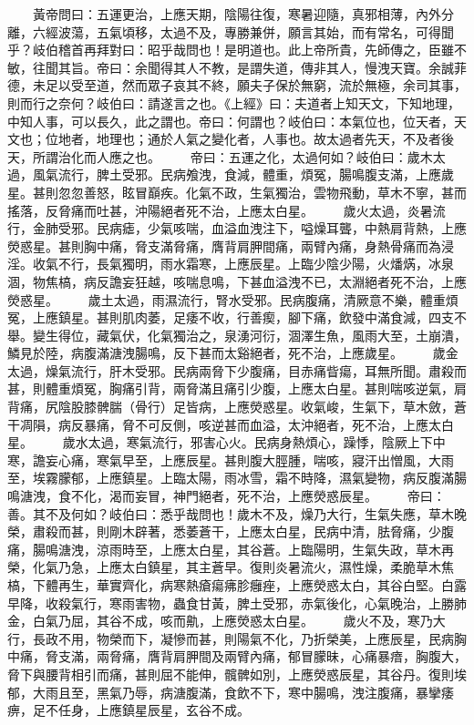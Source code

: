 　　黃帝問曰：五運更治，上應天期，陰陽往復，寒暑迎隨，真邪相薄，內外分離，六經波蕩，五氣頃移，太過不及，專勝兼併，願言其始，而有常名，可得聞乎？岐伯稽首再拜對曰：昭乎哉問也！是明道也。此上帝所貴，先師傳之，臣雖不敏，往聞其旨。帝曰：余聞得其人不教，是謂失道，傳非其人，慢洩天寶。余誠菲德，未足以受至道，然而眾子哀其不終，願夫子保於無窮，流於無極，余司其事，則而行之奈何？岐伯曰：請遂言之也。《上經》曰：夫道者上知天文，下知地理，中知人事，可以長久，此之謂也。帝曰：何謂也？岐伯曰：本氣位也，位天者，天文也；位地者，地理也；通於人氣之變化者，人事也。故太過者先天，不及者後天，所謂治化而人應之也。
　　帝曰：五運之化，太過何如？岐伯曰：歲木太過，風氣流行，脾土受邪。民病飧洩，食減，體重，煩冤，腸鳴腹支滿，上應歲星。甚則忽忽善怒，眩冒巔疾。化氣不政，生氣獨治，雲物飛動，草木不寧，甚而搖落，反脅痛而吐甚，沖陽絕者死不治，上應太白星。
　　歲火太過，炎暑流行，金肺受邪。民病瘧，少氣咳喘，血溢血洩注下，嗌燥耳聾，中熱肩背熱，上應熒惑星。甚則胸中痛，脅支滿脅痛，膺背肩胛間痛，兩臂內痛，身熱骨痛而為浸淫。收氣不行，長氣獨明，雨水霜寒，上應辰星。上臨少陰少陽，火燔焫，冰泉涸，物焦槁，病反譫妄狂越，咳喘息鳴，下甚血溢洩不已，太淵絕者死不治，上應熒惑星。
　　歲土太過，雨濕流行，腎水受邪。民病腹痛，清厥意不樂，體重煩冤，上應鎮星。甚則肌肉萎，足痿不收，行善瘈，腳下痛，飲發中滿食減，四支不舉。變生得位，藏氣伏，化氣獨治之，泉湧河衍，涸澤生魚，風雨大至，土崩潰，鱗見於陸，病腹滿溏洩腸鳴，反下甚而太谿絕者，死不治，上應歲星。
　　歲金太過，燥氣流行，肝木受邪。民病兩脅下少腹痛，目赤痛眥瘍，耳無所聞。肅殺而甚，則體重煩冤，胸痛引背，兩脅滿且痛引少腹，上應太白星。甚則喘咳逆氣，肩背痛，尻陰股膝髀腨（骨行）足皆病，上應熒惑星。收氣峻，生氣下，草木斂，蒼干凋隕，病反暴痛，脅不可反側，咳逆甚而血溢，太沖絕者，死不治，上應太白星。
　　歲水太過，寒氣流行，邪害心火。民病身熱煩心，躁悸，陰厥上下中寒，譫妄心痛，寒氣早至，上應辰星。甚則腹大脛腫，喘咳，寢汗出憎風，大雨至，埃霧朦郁，上應鎮星。上臨太陽，雨冰雪，霜不時降，濕氣變物，病反腹滿腸鳴溏洩，食不化，渴而妄冒，神門絕者，死不治，上應熒惑辰星。
　　帝曰：善。其不及何如？岐伯曰：悉乎哉問也！歲木不及，燥乃大行，生氣失應，草木晚榮，肅殺而甚，則剛木辟著，悉萎蒼干，上應太白星，民病中清，胠脅痛，少腹痛，腸鳴溏洩，涼雨時至，上應太白星，其谷蒼。上臨陽明，生氣失政，草木再榮，化氣乃急，上應太白鎮星，其主蒼早。復則炎暑流火，濕性燥，柔脆草木焦槁，下體再生，華實齊化，病寒熱瘡瘍疿胗癰痤，上應熒惑太白，其谷白堅。白露早降，收殺氣行，寒雨害物，蟲食甘黃，脾土受邪，赤氣後化，心氣晚治，上勝肺金，白氣乃屈，其谷不成，咳而鼽，上應熒惑太白星。
　　歲火不及，寒乃大行，長政不用，物榮而下，凝慘而甚，則陽氣不化，乃折榮美，上應辰星，民病胸中痛，脅支滿，兩脅痛，膺背肩胛間及兩臂內痛，郁冒朦昧，心痛暴瘖，胸腹大，脅下與腰背相引而痛，甚則屈不能伸，髖髀如別，上應熒惑辰星，其谷丹。復則埃郁，大雨且至，黑氣乃辱，病溏腹滿，食飲不下，寒中腸鳴，洩注腹痛，暴攣痿痹，足不任身，上應鎮星辰星，玄谷不成。
